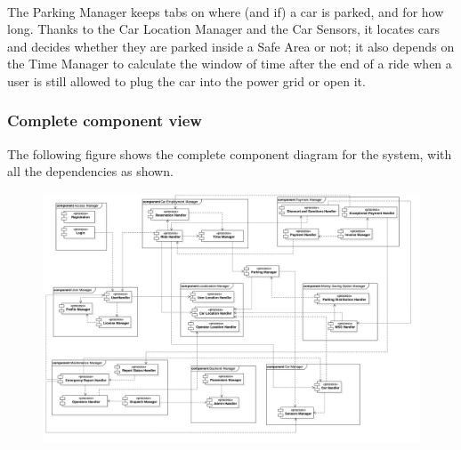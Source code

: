		\paragraph{} The Parking Manager keeps tabs on where (and if) a car is parked, and for how long. Thanks to the Car Location Manager and the Car Sensors, it locates cars and decides whether they are parked inside a Safe Area or not; it also depends on the Time Manager to calculate the window of time after the end of a ride when a user is still allowed to plug the car into the power grid or open it.
		
	\subsubsection{Complete component view}
	
	The following figure shows the complete component diagram for the system, with all the dependencies as shown. 
	
		\begin{figure}[h]
				\includegraphics[scale=0.1, center]{img/component_diagrams/10_complete_component_view.png}
			\end{figure}
			
